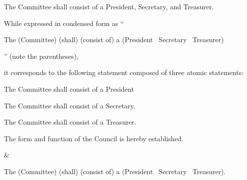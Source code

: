 \begin{landscape}
\begin{longtable}{\tabledims}
\sp


\begin{exi}The Committee shall consist of a President, Secretary, and Treasurer.\end{exi}

\sp

While expressed in condensed form as ``\begin{exi}The \E{}(Committee)  \M{}(shall) \F{}(consist of) a \Pp{}(\lpconst President \AND{}~Secretary \AND{}~Treasurer\rpconst)\end{exi}'' (note the parentheses),

\sp

it corresponds to the following statement composed of three atomic statements:

\sp

 \begin{exi}The Committee shall consist of a President\end{exi}

\sp

\ANDconst

\sp

 \begin{exi}The Committee shall consist of a Secretary.\end{exi}

\sp

\ANDconst 

\sp

 \begin{exi}The Committee shall consist of a Treasurer.\end{exi}

\sp

 \begin{exi}The form and function of the Council is hereby established.\end{exi}

\sp

&


\begin{exi}The \E{}(Committee) \M{}(shall) \F{}(consist of) a \Pp{}(\lpconst President \ANDconst~Secretary
\ANDconst~Treasurer\rpconst).\end{exi}

\sp



\end{longtable}
\end{landscape}
